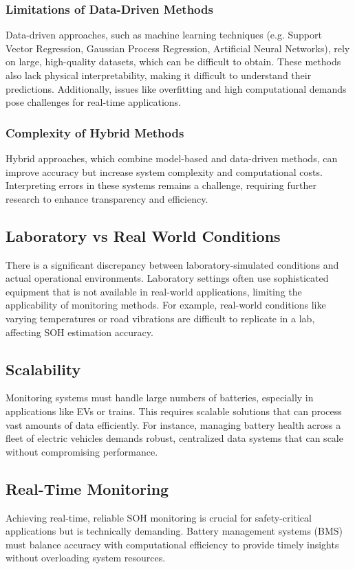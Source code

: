 \subsubsection{Limitations of Data-Driven Methods}
Data-driven approaches, such as machine learning techniques (e.g. Support Vector Regression, Gaussian Process Regression, Artificial Neural Networks), rely on large, high-quality datasets, which can be difficult to obtain. 
These methods also lack physical interpretability, making it difficult to understand their predictions. 
Additionally, issues like overfitting and high computational demands pose challenges for real-time applications.

\subsubsection{Complexity of Hybrid Methods}
Hybrid approaches, which combine model-based and data-driven methods, can improve accuracy but increase system complexity and computational costs. 
Interpreting errors in these systems remains a challenge, requiring further research to enhance transparency and efficiency.

\subsection{Laboratory vs Real World Conditions}
There is a significant discrepancy between laboratory-simulated conditions and actual operational environments. 
Laboratory settings often use sophisticated equipment that is not available in real-world applications, limiting the applicability of monitoring methods. For example, real-world conditions like varying temperatures or road vibrations are difficult to replicate in a lab, affecting SOH estimation accuracy.

\subsection{Scalability}
Monitoring systems must handle large numbers of batteries, especially in applications like EVs or trains. 
This requires scalable solutions that can process vast amounts of data efficiently. 
For instance, managing battery health across a fleet of electric vehicles demands robust, centralized data systems that can scale without compromising performance.

\subsection{Real-Time Monitoring}
Achieving real-time, reliable SOH monitoring is crucial for safety-critical applications but is technically demanding. 
Battery management systems (BMS) must balance accuracy with computational efficiency to provide timely insights without overloading system resources.

